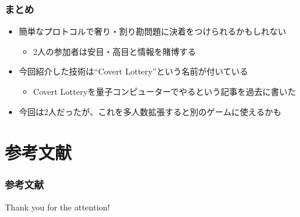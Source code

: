 \begin{frame}
  \frametitle{まとめ}

  \pause
  \begin{itemize}
    \item<+-> 簡単なプロトコルで奢り・割り勘問題に決着をつけられるかもしれない
    \begin{itemize}
      \item 2人の参加者は安目・高目と情報を賭博する
    \end{itemize}

    \item<+-> 今回紹介した技術は``Covert Lottery\cite{covert_lottery}''という名前が付いている
    \begin{itemize}
      \item Covert Lotteryを量子コンピューターでやるという記事\cite{quantum_covert_lottery}を過去に書いた
    \end{itemize}

    \item<+-> 今回は2人だったが、これを多人数拡張すると別のゲームに使えるかも
  \end{itemize}
\end{frame}

\section*{参考文献}
\begin{frame}[allowframebreaks]
  \frametitle{参考文献}
  \nocite{*}
  
  
\end{frame}

\begin{frame}
  \centering
  {\Huge Thank you for the attention!}
\end{frame}


